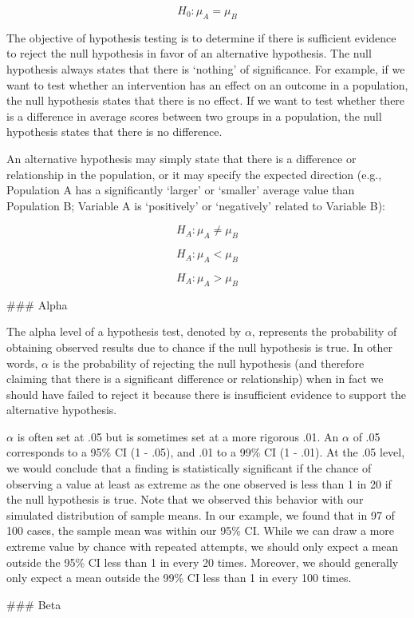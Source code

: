 \documentclass[]{book}
\begin{document}
\[ H_0: \mu_A = \mu_B \]

The objective of hypothesis testing is to determine if there is sufficient evidence to reject the null hypothesis in favor of an alternative hypothesis. The null hypothesis always states that there is `nothing' of significance. For example, if we want to test whether an intervention has an effect on an outcome in a population, the null hypothesis states that there is no effect. If we want to test whether there is a difference in average scores between two groups in a population, the null hypothesis states that there is no difference.

An alternative hypothesis may simply state that there is a difference or relationship in the population, or it may specify the expected direction (e.g., Population A has a significantly `larger' or `smaller' average value than Population B; Variable A is `positively' or `negatively' related to Variable B):

\[ H_A: \mu_A \neq \mu_B \]

\[ H_A: \mu_A < \mu_B \]

\[ H_A: \mu_A > \mu_B \]

\#\#\# Alpha

The alpha level of a hypothesis test, denoted by \(\alpha\), represents the probability of obtaining observed results due to chance if the null hypothesis is true. In other words, \(\alpha\) is the probability of rejecting the null hypothesis (and therefore claiming that there is a significant difference or relationship) when in fact we should have failed to reject it because there is insufficient evidence to support the alternative hypothesis.

\(\alpha\) is often set at .05 but is sometimes set at a more rigorous .01. An \(\alpha\) of .05 corresponds to a 95\% CI (1 - .05), and .01 to a 99\% CI (1 - .01). At the .05 level, we would conclude that a finding is statistically significant if the chance of observing a value at least as extreme as the one observed is less than 1 in 20 if the null hypothesis is true. Note that we observed this behavior with our simulated distribution of sample means. In our example, we found that in 97 of 100 cases, the sample mean was within our 95\% CI. While we can draw a more extreme value by chance with repeated attempts, we should only expect a mean outside the 95\% CI less than 1 in every 20 times. Moreover, we should generally only expect a mean outside the 99\% CI less than 1 in every 100 times.

\#\#\# Beta
\end{document}
